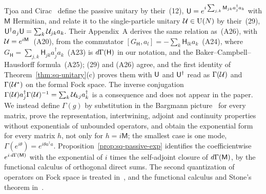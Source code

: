 \begin{vetdenv}
Tjoa and Cirac~\cite{tjoacirac} define the passive unitary by their~(12),
$\mathsf U=e^{i\sum_{j,k}\mathsf M_{jk}a_j^\dagger a_k}$ with $\mathsf M$ Hermitian, and relate it to the single-particle
unitary $\mathcal U\in\mathrm U(N)$ by their~(29), $\mathsf U^\dagger a_j\mathsf U=\sum_k\mathcal U_{jk}a_k$. Their Appendix~A derives the same
relation as~(A26), with $\mathcal U=e^{i\mathsf M}$~(A20), from the commutator $[G_{\mathsf H},a_l]=-\sum_k\mathsf H_{lk}a_k$~(A24),
where $G_{\mathsf H}=\sum_{j,k}\mathsf H_{jk}a_j^\dagger a_k$~(A23) is $d\Gamma(\mathsf H)$ in our notation, and the
Baker--Campbell--Hausdorff formula~(A25); (29) and (A26) agree, and the first identity of Theorem~\ref{thm:sq-unitary}(c) proves them with $\mathsf U$ and $\mathsf U^\dagger$ read as $\Gamma(\mathcal U)$ and $\Gamma(\mathcal U^*)$ on the formal Fock space. The
inverse conjugation $\Gamma(\mathcal U)a_j^\dagger\Gamma(\mathcal U)^{-1}=\sum_k\mathcal U_{kj}a_k^\dagger$ is a consequence and does not
appear in the paper. We instead define $\Gamma(g)$ by substitution in the Bargmann picture~\cite{bargmann} for every
matrix, prove the representation, intertwining, adjoint and continuity properties without exponentials of unbounded
operators, and obtain the exponential form for every matrix $h$, not only for $h=i\mathsf M$; the smallest case is
one mode, $\Gamma(e^{i\theta})=e^{i\theta a^\dagger a}$. Proposition~\ref{prop:sq-passive-exp} identifies the coefficientwise $e^{i\,d\Gamma(\mathsf M)}$ with
the exponential of $i$ times the self-adjoint closure of $d\Gamma(\mathsf M)$, by the functional
calculus of orthogonal direct sums. The second quantization of operators on Fock space is treated
in~\cite{dg}, and the functional
calculus and Stone's theorem in~\cite[]{rs1}.
\end{vetdenv}
